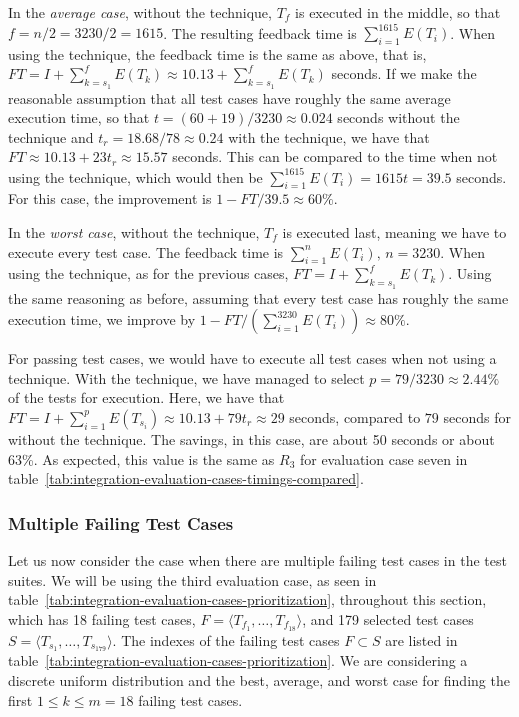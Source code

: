 \documentclass[a4paper,english,12pt]{report}
\begin{document}
In the \textit{average case}, without the technique, $T_f$ is executed in the middle, so that $f=n/2=3230/2=1615$. The resulting feedback time is $\sum_{i=1}^{1615} E(T_i)$. When using the technique, the feedback time is the same as above, that is, $\mathit{FT} = I + \sum_{k=s_1}^{f} E(T_k)\approx 10.13+\sum_{k=s_1}^{f} E(T_k)$ seconds. If we make the reasonable assumption that all test cases have roughly the same average execution time, so that $t=(60+19)/3230\approx 0.024$ seconds without the technique and $t_r=18.68/78\approx 0.24$ with the technique, we have that $\mathit{FT}\approx 10.13+23t_r\approx15.57$ seconds. This can be compared to the time when not using the technique, which would then be $\sum_{i=1}^{1615} E(T_i)=1615t=39.5$ seconds. For this case, the improvement is $1-\mathit{FT}/39.5\approx 60\%$.

In the \textit{worst case}, without the technique, $T_f$ is executed last, meaning we have to execute every test case. The feedback time is $\sum_{i=1}^{n} E(T_i),\,n=3230$. When using the technique, as for the previous cases, $\mathit{FT} = I + \sum_{k=s_1}^{f} E(T_k)$. Using the same reasoning as before, assuming that every test case has roughly the same execution time, we improve by $1-\mathit{FT}/(\sum_{i=1}^{3230} E(T_i))\approx 80\%$.

For passing test cases, we would have to execute all test cases when not using a technique. With the technique, we have managed to select $p=79/3230\approx 2.44\%$ of the tests for execution. Here, we have that $\mathit{FT}=I+\sum_{i=1}^{p} E(T_{s_i})\approx 10.13+79t_r\approx 29$ seconds, compared to $79$ seconds for without the technique. The savings, in this case, are about 50 seconds or about 63\%. As expected, this value is the same as $R_3$ for evaluation case seven in table~\vref{tab:integration-evaluation-cases-timings-compared}.

\subsubsection{Multiple Failing Test Cases}
Let us now consider the case when there are multiple failing test cases in the test suites. We will be using the third evaluation case, as seen in table~\vref{tab:integration-evaluation-cases-prioritization}, throughout this section, which has 18 failing test cases, $F=\langle T_{f_1},\ldots,T_{f_{18}} \rangle$, and 179 selected test cases $S=\langle T_{s_1},\ldots,T_{s_{179}} \rangle$. The indexes of the failing test cases $F\subset S$ are listed in table~\vref{tab:integration-evaluation-cases-prioritization}. We are considering a discrete uniform distribution and the best, average, and worst case for finding the first $1 \leq k \leq m = 18$ failing test cases.
\end{document}
